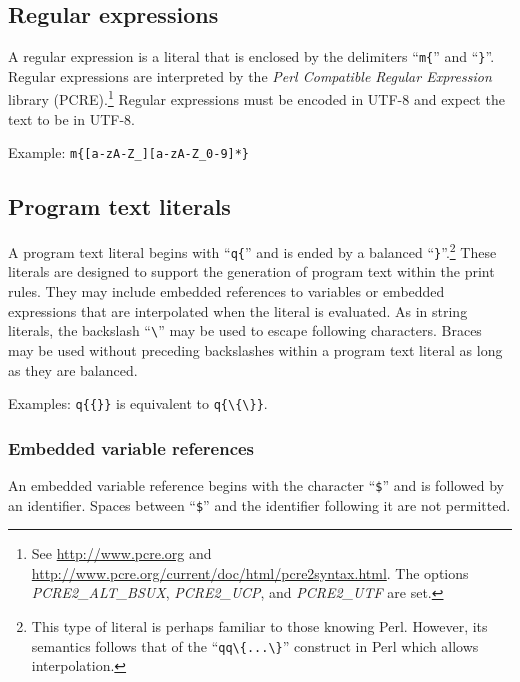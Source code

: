 \subsection{Regular expressions}\label{regexlit}

A regular expression is a literal that is enclosed by the
delimiters ``\lstinline!m{!'' and ``\lstinline!}!''. Regular
expressions are interpreted by the \textit{Perl Compatible
Regular Expression} library (PCRE).\footnote{See
\url{http://www.pcre.org} and
\url{http://www.pcre.org/current/doc/html/pcre2syntax.html}. The
options \textit{PCRE2\_ALT\_BSUX}, \textit{PCRE2\_UCP},
and \textit{PCRE2\_UTF} are set.} Regular expressions
must be encoded in UTF-8 and expect the text to be in UTF-8.

Example: \lstinline!m{[a-zA-Z_][a-zA-Z_0-9]*}!

\subsection{Program text literals}

A program text literal begins with ``\lstinline!q{!'' and
is ended by a balanced ``\lstinline!}!''.\footnote{This
type of literal is perhaps familiar to those knowing Perl.
However, its semantics follows that of the ``\lstinline!qq\{...\}!''
construct in Perl which allows interpolation.}
These literals are designed to support the generation of program text within
the print rules. They may include embedded
references to variables or embedded expressions that are
interpolated when the literal is evaluated. As in
string literals, the backslash ``\lstinline!\!'' may be used to
escape following characters. Braces may be used without preceding
backslashes within a program text literal as long as they are
balanced.

Examples: \lstinline!q{{}}! is equivalent to \lstinline!q{\{\}}!.

\subsubsection{Embedded variable references}

An embedded variable reference begins with the character
``\lstinline!$!''%
and is followed by an identifier. Spaces between
``\lstinline!$!''%
and the identifier following it are not permitted.

